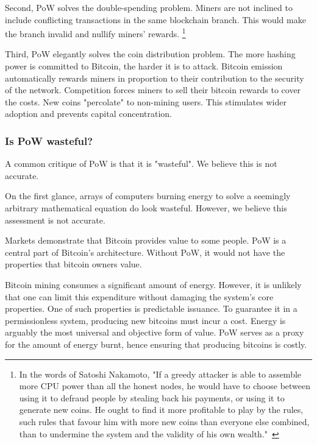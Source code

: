 Second, PoW solves the double-spending problem.
Miners are not inclined to include conflicting transactions in the same blockchain branch.
This would make the branch invalid and nullify miners' rewards.
\footnote{In the words of Satoshi Nakamoto, "If a greedy attacker is able to assemble more CPU power than all the honest nodes, he would have to choose between using it to defraud people by stealing back his payments, or using it to generate new coins. He ought to find it more profitable to play by the rules, such rules that favour him with more new coins than everyone else combined, than to undermine the system and the validity of his own wealth."~\cite{nakamoto2008bitcoin}}

Third, PoW elegantly solves the coin distribution problem.
The more hashing power is committed to Bitcoin, the harder it is to attack.
Bitcoin emission automatically rewards miners in proportion to their contribution to the security of the network.
Competition forces miners to sell their bitcoin rewards to cover the costs.
New coins "percolate" to non-mining users.
This stimulates wider adoption and prevents capital concentration.


\subsubsection*{Is PoW wasteful?}

A common critique of PoW is that it is "wasteful".
We believe this is not accurate.

On the first glance, arrays of computers burning energy to solve a seemingly arbitrary mathematical equation do look wasteful.
However, we believe this assessment is not accurate.

Markets demonstrate that Bitcoin provides value to some people.
PoW is a central part of Bitcoin's architecture.
Without PoW, it would not have the properties that bitcoin owners value.

Bitcoin mining consumes a significant amount of energy.
However, it is unlikely that one can limit this expenditure without damaging the system's core properties.
One of such properties is predictable issuance.
To guarantee it in a permissionless system, producing new bitcoins must incur a cost.
Energy is arguably the most universal and objective form of value.
PoW serves as a proxy for the amount of energy burnt, hence ensuring that producing bitcoins is costly.


